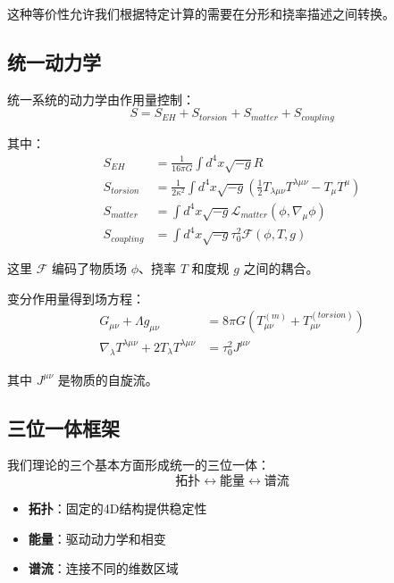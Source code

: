 这种等价性允许我们根据特定计算的需要在分形和挠率描述之间转换。

\subsection{统一动力学}

统一系统的动力学由作用量控制：
\begin{equation}
    S = S_{EH} + S_{torsion} + S_{matter} + S_{coupling}
\end{equation}

其中：
\begin{align}
    S_{EH} &= \frac{1}{16\pi G} \int d^4x \sqrt{-g} R \\
    S_{torsion} &= \frac{1}{2\kappa^2} \int d^4x \sqrt{-g} \left(\frac{1}{2}T_{\lambda\mu\nu}T^{\lambda\mu\nu} - T_\mu T^\mu\right) \\
    S_{matter} &= \int d^4x \sqrt{-g} \mathcal{L}_{matter}(\phi, \nabla_\mu\phi) \\
    S_{coupling} &= \int d^4x \sqrt{-g} \tau_0^2 \mathcal{F}(\phi, T, g)
\end{align}

这里 $\mathcal{F}$ 编码了物质场 $\phi$、挠率 $T$ 和度规 $g$ 之间的耦合。

变分作用量得到场方程：
\begin{align}
    G_{\mu\nu} + \Lambda g_{\mu\nu} &= 8\pi G (T^{(m)}_{\mu\nu} + T^{(torsion)}_{\mu\nu}) \\
    \nabla_\lambda T^{\lambda\mu\nu} + 2T_\lambda T^{\lambda\mu\nu} &= \tau_0^2 J^{\mu\nu}
\end{align}

其中 $J^{\mu\nu}$ 是物质的自旋流。

\subsection{三位一体框架}

我们理论的三个基本方面形成统一的三位一体：
\begin{equation}
    \text{拓扑} \leftrightarrow \text{能量} \leftrightarrow \text{谱流}
\end{equation}

\begin{itemize}
    \item \textbf{拓扑}：固定的4D结构提供稳定性
    \item \textbf{能量}：驱动动力学和相变
    \item \textbf{谱流}：连接不同的维数区域
\end{itemize}

